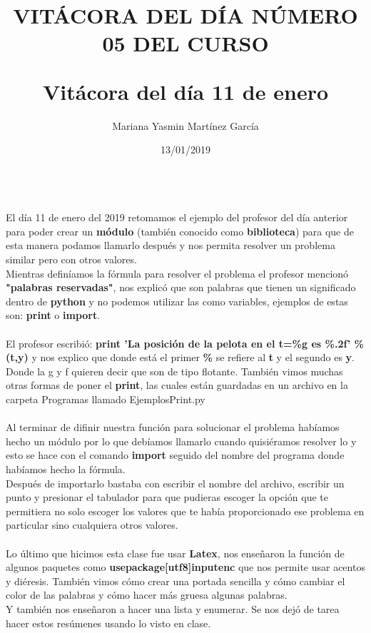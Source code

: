 \documentclass[letterpaper, 12pt, twoside]{article}
\title{\Huge\item\color{red}\textbf {VITÁCORA DEL DÍA NÚMERO 05 DEL CURSO}}
\author{Mariana Yasmin Martínez García}
\date{13/01/2019}
\begin{document}
	\maketitle
	
	\newpage
	\title{\huge\textbf{Vitácora del día 11 de enero\\}} \\
	El día 11 de enero del 2019 retomamos el ejemplo del profesor del día anterior para poder crear un \textbf{módulo} (también conocido como \textbf{biblioteca}) para que de esta manera podamos llamarlo después y nos permita resolver un problema similar pero con otros valores.\\
	Mientras definíamos la fórmula para resolver el problema el profesor  mencionó \textbf{"palabras reservadas"}, nos explicó que son palabras que tienen un significado dentro de \textbf{python} y no podemos utilizar las como variables, ejemplos de estas son: \textbf{print} o \textbf{import}. \\ \\
	El profesor escribió: \textbf{print 'La posición de la pelota en el t=\%g es \%.2f' \% (t,y)}
	y nos explico que donde está el primer \textbf{\%} se refiere al \textbf{t} y el segundo es \textbf{y}. Donde la g y f quieren decir que son de tipo flotante.
	También vimos muchas otras formas de poner el \textbf{print}, las cuales están guardadas en un archivo en la carpeta Programas llamado EjemplosPrint.py \\  \\
	Al terminar de difinir nuestra función para solucionar el problema habíamos hecho un módulo por lo que debíamos llamarlo cuando quisiéramos resolver lo y esto se hace con el comando \textbf{import} seguido del nombre del programa donde habíamos hecho la fórmula. \\
	Después de importarlo bastaba con escribir el nombre del archivo, escribir un punto y presionar el tabulador para que pudieras escoger la opción que te permitiera no solo escoger los valores que te había proporcionado ese problema en particular sino cualquiera otros valores.\\ \\
	Lo último que hicimos esta clase fue usar \textbf{Latex}, nos enseñaron la función de algunos paquetes como \textbf{usepackage[utf8]{inputenc}} que nos permite usar acentos y diéresis. También vimos cómo crear una portada sencilla y cómo cambiar el color de las palabras y cómo hacer más gruesa algunas palabras. \\
	Y también nos enseñaron a hacer una lista  y enumerar.
	Se nos dejó de tarea hacer estos resúmenes usando lo visto en clase.
	
	
\end{document}
